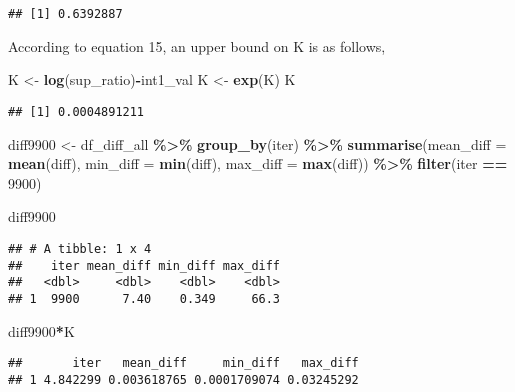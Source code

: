 \documentclass[
]{article}
\newenvironment{Shaded}{\begin{snugshade}}{\end{snugshade}}
\newcommand{\AttributeTok}[1]{\textcolor[rgb]{0.13,0.29,0.53}{#1}}
\newcommand{\DecValTok}[1]{\textcolor[rgb]{0.00,0.00,0.81}{#1}}
\newcommand{\FunctionTok}[1]{\textcolor[rgb]{0.13,0.29,0.53}{\textbf{#1}}}
\newcommand{\NormalTok}[1]{#1}
\newcommand{\OtherTok}[1]{\textcolor[rgb]{0.56,0.35,0.01}{#1}}
\newcommand{\SpecialCharTok}[1]{\textcolor[rgb]{0.81,0.36,0.00}{\textbf{#1}}}
\begin{document}
\begin{verbatim}
## [1] 0.6392887
\end{verbatim}

According to equation 15, an upper bound on K is as follows,

\begin{Shaded}
\begin{Highlighting}[]
\NormalTok{K }\OtherTok{\textless{}{-}} \FunctionTok{log}\NormalTok{(sup\_ratio)}\SpecialCharTok{{-}}\NormalTok{int1\_val}
\NormalTok{K }\OtherTok{\textless{}{-}} \FunctionTok{exp}\NormalTok{(K)}
\NormalTok{K}
\end{Highlighting}
\end{Shaded}

\begin{verbatim}
## [1] 0.0004891211
\end{verbatim}

\begin{Shaded}
\begin{Highlighting}[]
\NormalTok{diff9900 }\OtherTok{\textless{}{-}}\NormalTok{ df\_diff\_all }\SpecialCharTok{\%\textgreater{}\%}
  \FunctionTok{group\_by}\NormalTok{(iter) }\SpecialCharTok{\%\textgreater{}\%}
  \FunctionTok{summarise}\NormalTok{(}\AttributeTok{mean\_diff =} \FunctionTok{mean}\NormalTok{(diff), }\AttributeTok{min\_diff =}  \FunctionTok{min}\NormalTok{(diff), }\AttributeTok{max\_diff =} \FunctionTok{max}\NormalTok{(diff)) }\SpecialCharTok{\%\textgreater{}\%} 
  \FunctionTok{filter}\NormalTok{(iter }\SpecialCharTok{==} \DecValTok{9900}\NormalTok{)}

\NormalTok{diff9900}
\end{Highlighting}
\end{Shaded}

\begin{verbatim}
## # A tibble: 1 x 4
##    iter mean_diff min_diff max_diff
##   <dbl>     <dbl>    <dbl>    <dbl>
## 1  9900      7.40    0.349     66.3
\end{verbatim}

\begin{Shaded}
\begin{Highlighting}[]
\NormalTok{diff9900}\SpecialCharTok{*}\NormalTok{K}
\end{Highlighting}
\end{Shaded}

\begin{verbatim}
##       iter   mean_diff     min_diff   max_diff
## 1 4.842299 0.003618765 0.0001709074 0.03245292
\end{verbatim}
\end{document}
